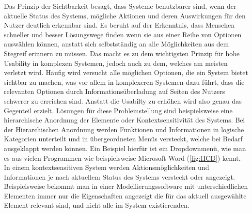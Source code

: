 Das Prinzip der Sichtbarkeit besagt, dass Systeme benutzbarer sind, wenn der aktuelle Status des Systems, mögliche Aktionen und deren Auswirkungen für den Nutzer deutlich erkennbar sind.
Es beruht auf der Erkenntnis, dass Menschen schneller und besser Lösungswege finden wenn sie aus einer Reihe von Optionen auswählen können, anstatt sich selbstständig an alle Möglichkeiten aus dem Stegreif erinnern zu müssen\cite{Lidwell.2010}.
Das macht es zu dem wichtigsten Prinzip für hohe Usability in komplexen Systemen, jedoch auch zu dem, welches am meisten verletzt wird\cite{Norman.2016}.
Häufig wird versucht alle möglichen Optionen, die ein System bietet sichtbar zu machen, was vor allem in komplexeren Systemen dazu führt, dass die relevanten Optionen durch Informationsüberladung auf Seiten des Nutzers schwerer zu erreichen sind. 
Anstatt die Usabilty zu erhöhen wird also genau das Gegenteil erzielt.
Lösungen für diese Problemstellung sind beispielsweise eine hierarchische Anordnung der Elemente oder Kontextsensitivität des Systems.
Bei der Hierarchischen Anordnung werden Funktionen und Informationen in logische Kategorien unterteilt und in übergeordneten Menüs versteckt, welche bei Bedarf ausgeklappt werden können.
Ein Beispiel hierfür ist ein Dropdownmenü, wie man es aus vielen Programmen wie beispielsweise Microsoft Word (\cref{fig:HCD}) kennt.
In einem kontextsensitiven System werden Aktionsmöglichkeiten und Informationen je nach aktuellem Status des Systems versteckt oder angezeigt. Beispielsweise bekommt man in einer Modellierungssoftware mit unterschiedlichen Elementen immer nur die Eigenschaften angezeigt die für das aktuell ausgewählte Element relevant sind, und nicht alle im System existierenden\cite{Lidwell.2010}.

